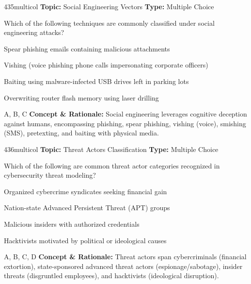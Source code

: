 \begin{qcard}{435}{multicol}
\textcolor{darkslate!75}{\small\textbf{Topic:} Social Engineering Vectors \hfill \textbf{Type:} Multiple Choice}\vspace{0.4em}\par
Which of the following techniques are commonly classified under social engineering attacks?
\begin{qoptions}
\item Spear phishing emails containing malicious attachments
\item Vishing (voice phishing phone calls impersonating corporate officers)
\item Baiting using malware-infected USB drives left in parking lots
\item Overwriting router flash memory using laser drilling
\end{qoptions}
\end{qcard}
\nopagebreak
\begin{explainbox}{A, B, C}
\textbf{Concept \& Rationale:} Social engineering leverages cognitive deception against humans, encompassing phishing, spear phishing, vishing (voice), smishing (SMS), pretexting, and baiting with physical media.
\end{explainbox}

\begin{qcard}{436}{multicol}
\textcolor{darkslate!75}{\small\textbf{Topic:} Threat Actors Classification \hfill \textbf{Type:} Multiple Choice}\vspace{0.4em}\par
Which of the following are common threat actor categories recognized in cybersecurity threat modeling?
\begin{qoptions}
\item Organized cybercrime syndicates seeking financial gain
\item Nation-state Advanced Persistent Threat (APT) groups
\item Malicious insiders with authorized credentials
\item Hacktivists motivated by political or ideological causes
\end{qoptions}
\end{qcard}
\nopagebreak
\begin{explainbox}{A, B, C, D}
\textbf{Concept \& Rationale:} Threat actors span cybercriminals (financial extortion), state-sponsored advanced threat actors (espionage/sabotage), insider threats (disgruntled employees), and hacktivists (ideological disruption).
\end{explainbox}

